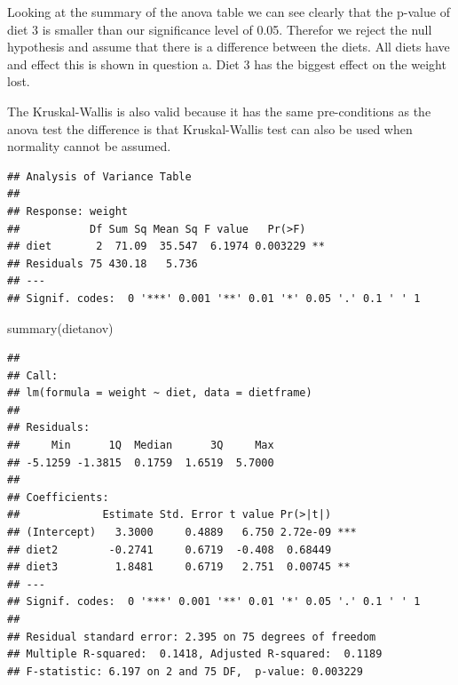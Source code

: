 \documentclass[
]{article}
\newenvironment{Shaded}{\begin{snugshade}}{\end{snugshade}}
\newcommand{\AttributeTok}[1]{\textcolor[rgb]{0.77,0.63,0.00}{#1}}
\newcommand{\FunctionTok}[1]{\textcolor[rgb]{0.00,0.00,0.00}{#1}}
\newcommand{\NormalTok}[1]{#1}
\newcommand{\OtherTok}[1]{\textcolor[rgb]{0.56,0.35,0.01}{#1}}
\newcommand{\SpecialCharTok}[1]{\textcolor[rgb]{0.00,0.00,0.00}{#1}}
\begin{document}
Looking at the summary of the anova table we can see clearly that the
p-value of diet 3 is smaller than our significance level of 0.05.
Therefor we reject the null hypothesis and assume that there is a
difference between the diets. All diets have and effect this is shown in
question a. Diet 3 has the biggest effect on the weight lost.

The Kruskal-Wallis is also valid because it has the same pre-conditions
as the anova test the difference is that Kruskal-Wallis test can also be
used when normality cannot be assumed.

\begin{Shaded}
\end{Shaded}

\begin{verbatim}
## Analysis of Variance Table
## 
## Response: weight
##           Df Sum Sq Mean Sq F value   Pr(>F)   
## diet       2  71.09  35.547  6.1974 0.003229 **
## Residuals 75 430.18   5.736                    
## ---
## Signif. codes:  0 '***' 0.001 '**' 0.01 '*' 0.05 '.' 0.1 ' ' 1
\end{verbatim}

\begin{Shaded}
\begin{Highlighting}[]
\FunctionTok{summary}\NormalTok{(dietanov)}
\end{Highlighting}
\end{Shaded}

\begin{verbatim}
## 
## Call:
## lm(formula = weight ~ diet, data = dietframe)
## 
## Residuals:
##     Min      1Q  Median      3Q     Max 
## -5.1259 -1.3815  0.1759  1.6519  5.7000 
## 
## Coefficients:
##             Estimate Std. Error t value Pr(>|t|)    
## (Intercept)   3.3000     0.4889   6.750 2.72e-09 ***
## diet2        -0.2741     0.6719  -0.408  0.68449    
## diet3         1.8481     0.6719   2.751  0.00745 ** 
## ---
## Signif. codes:  0 '***' 0.001 '**' 0.01 '*' 0.05 '.' 0.1 ' ' 1
## 
## Residual standard error: 2.395 on 75 degrees of freedom
## Multiple R-squared:  0.1418, Adjusted R-squared:  0.1189 
## F-statistic: 6.197 on 2 and 75 DF,  p-value: 0.003229
\end{verbatim}
\end{document}
